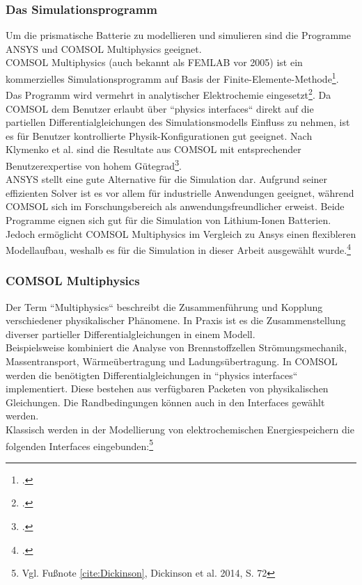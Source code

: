 \subsubsection*{Das Simulationsprogramm}

Um die prismatische Batterie zu modellieren und simulieren sind die Programme ANSYS\textsuperscript{\textregistered} und COMSOL Multiphysics\textsuperscript{\textregistered} geeignet.\\
COMSOL Multiphysics\textsuperscript{\textregistered} (auch bekannt als FEMLAB vor 2005) ist ein kommerzielles \newline Simulationsprogramm auf Basis der Finite-Elemente-Methode\footcite[Vgl.\label{cite:comsolwebsite}][]{COMSOLWebsite2021}. Das Programm wird vermehrt in analytischer Elektrochemie eingesetzt\footcite[Vgl.\label{cite:Dickinson}][S.74]{Dickinson.2014}. Da COMSOL\textsuperscript{\textregistered} dem Benutzer erlaubt über ``physics interfaces`` direkt auf die partiellen Differentialgleichungen des Simulationsmodells Einfluss zu nehmen, ist es für Benutzer kontrollierte Physik-Konfigurationen gut geeignet. Nach Klymenko et al. sind die Resultate aus COMSOL\textsuperscript{\textregistered} mit entsprechender Benutzerexpertise von hohem Gütegrad\footcite[Vgl.][]{Klymenko.2013}.\\
ANSYS\textsuperscript{\textregistered} stellt eine gute Alternative für die Simulation dar. Aufgrund seiner effizienten Solver ist es vor allem für industrielle Anwendungen geeignet, während COMSOL\textsuperscript{\textregistered} sich im Forschungsbereich als anwendungsfreundlicher erweist. Beide Programme eignen sich gut für die Simulation von Lithium-Ionen Batterien. Jedoch ermöglicht COMSOL Multiphysics\textsuperscript{\textregistered} im Vergleich zu Ansys\textsuperscript{\textregistered} einen flexibleren Modellaufbau, weshalb es für die Simulation in dieser Arbeit ausgewählt wurde.\footcite[Vgl.][S.196]{Salvi.2010}\\


\subsubsection*{COMSOL Multiphysics\textsuperscript{\textregistered}}\label{subsub:comsolMulti}

Der Term ``Multiphysics`` beschreibt die Zusammenführung und Kopplung verschiedener physikalischer Phänomene. In Praxis ist es die Zusammenstellung diverser partieller Differentialgleichungen in einem Modell. \\
Beispielsweise kombiniert die Analyse von Brennstoffzellen Strömungsmechanik, Massentransport, Wärmeübertragung und Ladungsübertragung. In COMSOL\textsuperscript{\textregistered} werden die benötigten Differentialgleichungen in ``physics interfaces`` implementiert. Diese bestehen aus verfügbaren Packeten von physikalischen Gleichungen. Die Randbedingungen können auch in den Interfaces gewählt werden.\\
Klassisch werden in der Modellierung von elektrochemischen Energiespeichern die folgenden Interfaces eingebunden:\footnote{Vgl. Fußnote  \ref{cite:Dickinson}, Dickinson et al. 2014, S. 72}

